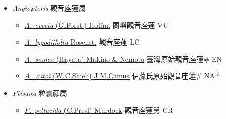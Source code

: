 
  \begin{itemize}
 \item[] \textit{Angiopteris} 觀音座蓮屬
                    
  \begin{itemize}
        \item[] \href{http://www.theplantlist.org/tpl1.1/search?q=Angiopteris+evecta}{\textit{A. evecta} (G.Forst.) Hoffm.}     蘭嶼觀音座蓮 VU
        \item[] \href{http://www.theplantlist.org/tpl1.1/search?q=Angiopteris+lygodiifolia}{\textit{A. lygodiifolia} Rosenst.}   觀音座蓮 LC
        \item[] \href{http://www.theplantlist.org/tpl1.1/search?q=Angiopteris+somae}{\textit{A. somae} (Hayata) Makino \& Nemoto}     臺灣原始觀音座蓮\# EN
        \item[] \href{http://www.theplantlist.org/tpl1.1/search?q=Angiopteris+×itoi}{\textit{A. ×itoi} (W.C.Shieh) J.M.Camus}     伊藤氏原始觀音座蓮\# NA $^h$
  \end{itemize}
 \item[] \textit{Ptisana} 粒囊蕨屬
                    
  \begin{itemize}
        \item[] \href{http://www.theplantlist.org/tpl1.1/search?q=Ptisana+pellucida}{\textit{P. pellucida} (C.Presl) Murdock}     觀音座蓮舅 CR
  \end{itemize}
  \end{itemize}

